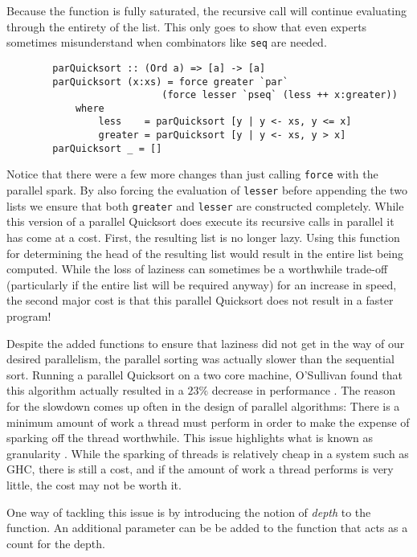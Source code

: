 Because the function is fully saturated, the recursive call will continue
evaluating through the entirety of the list. This only goes to show that even
experts sometimes misunderstand when combinators like \verb=seq= are needed.

\begin{verbatim}
        parQuicksort :: (Ord a) => [a] -> [a]
        parQuicksort (x:xs) = force greater `par`
                           (force lesser `pseq` (less ++ x:greater))
            where
                less    = parQuicksort [y | y <- xs, y <= x]
                greater = parQuicksort [y | y <- xs, y > x]
        parQuicksort _ = []
\end{verbatim}

Notice that there were a few more changes than just calling \verb=force= with
the parallel spark. By also forcing the evaluation of \verb=lesser= before
appending the two lists we ensure that both \verb=greater= and \verb=lesser=
are constructed completely. While this version of a parallel Quicksort does
execute its recursive calls in parallel it has come at a cost. First, the
resulting list is no longer lazy. Using this function for determining the head
of the resulting list would result in the entire list being computed. While
the loss of laziness can sometimes be a worthwhile trade-off (particularly
if the entire list will be required anyway) for an increase in speed, the
second major cost is that this parallel Quicksort does not result in a faster
program!

    Despite the added functions to ensure that laziness did not get in the way
of our desired parallelism, the parallel sorting was actually slower than the
sequential sort. Running a parallel Quicksort on a two core machine, O'Sullivan
found that this algorithm actually resulted in a $23\%$ decrease in
performance \citep{realWorld}. The reason for the slowdown comes up often in the
design of parallel algorithms: There is a minimum amount of work a thread must
perform in order to make the expense of sparking off the thread worthwhile. This
issue highlights what is known as granularity \citep{dutchBook}. While the sparking
of threads is relatively cheap in a system such as GHC, there is still a cost,
and if the amount of work a thread performs is very little, the cost may not be
worth it.

    One way of tackling this issue is by introducing the notion of \emph{depth}
to the function. An additional parameter can be be added to the function that
acts as a count for the depth.

